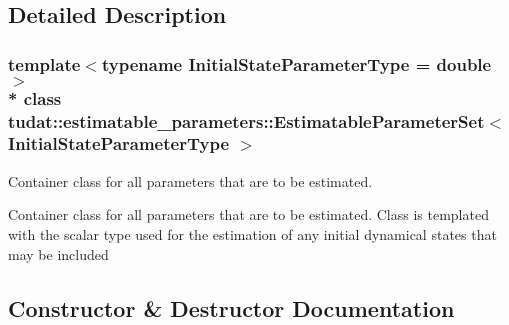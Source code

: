 \subsection{Detailed Description}
\subsubsection*{template$<$typename Initial\+State\+Parameter\+Type = double$>$\\*
class tudat\+::estimatable\+\_\+parameters\+::\+Estimatable\+Parameter\+Set$<$ Initial\+State\+Parameter\+Type $>$}

Container class for all parameters that are to be estimated. 

Container class for all parameters that are to be estimated. Class is templated with the scalar type used for the estimation of any initial dynamical states that may be included 

\subsection{Constructor \& Destructor Documentation}
